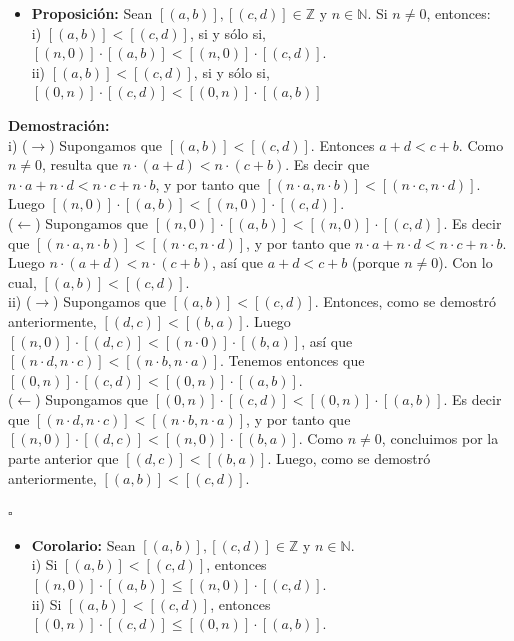\documentclass[10 pt]{article}
\begin{document}
\begin{itemize}
    \item \Large{\textbf{Proposición:} Sean $[(a,b)],[(c,d)] \in \mathbb Z$ y $n \in \mathbb N$. Si $n \neq 0$, entonces: \\

    i) $[(a,b)]<[(c,d)]$, si y sólo si, $[(n,0)] \cdot [(a,b)]<[(n,0)] \cdot [(c,d)]$. \\

    ii) $[(a,b)]<[(c,d)]$, si y sólo si, $[(0,n)] \cdot [(c,d)]<[(0,n)] \cdot [(a,b)]$ } \\
\end{itemize}

\Large{\textbf{Demostración:} \\

i) ($\rightarrow$) Supongamos que $[(a,b)]<[(c,d)]$. Entonces $a+d<c+b$. Como $n \neq 0$, resulta que $n \cdot (a+d)<n \cdot (c+b)$. Es decir que $n \cdot a+n \cdot d<n \cdot c+n \cdot b$, y por tanto que $[(n \cdot a,n \cdot b)]<[(n \cdot c,n \cdot d)]$. Luego $[(n,0)] \cdot [(a,b)]<[(n,0)] \cdot [(c,d)]$. \\

($\leftarrow$) Supongamos que $[(n,0)] \cdot [(a,b)]<[(n,0)] \cdot [(c,d)]$. Es decir que $[(n \cdot a,n \cdot b)]<[(n \cdot c,n \cdot d)]$, y por tanto que $n \cdot a+n \cdot d<n \cdot c+n \cdot b$. Luego $n \cdot (a+d)<n \cdot (c+b)$, así que $a+d<c+b$ (porque $n \neq 0$). Con lo cual, $[(a,b)]<[(c,d)]$. \\

ii) ($\rightarrow$) Supongamos que $[(a,b)]<[(c,d)]$. Entonces, como se demostró anteriormente, $[(d,c)]<[(b,a)]$. Luego $[(n,0)] \cdot [(d,c)]<[(n \cdot 0)] \cdot [(b,a)]$, así que $[(n \cdot d,n \cdot c)]<[(n \cdot b,n \cdot a)]$. Tenemos entonces que $[(0,n)] \cdot [(c,d)]<[(0,n)] \cdot [(a,b)]$. \\

($\leftarrow$) Supongamos que $[(0,n)] \cdot [(c,d)]<[(0,n)] \cdot [(a,b)]$. Es decir que $[(n \cdot d,n \cdot c)]<[(n \cdot b,n \cdot a)]$, y por tanto que $[(n,0)] \cdot [(d,c)]<[(n,0)] \cdot [(b,a)]$. Como $n \neq 0$, concluimos por la parte anterior que $[(d,c)]<[(b,a)]$. Luego, como se demostró anteriormente, $[(a,b)]<[(c,d)]$.} \\

\begin{flushright}
    $\square$
\end{flushright}

\begin{itemize}
    \item \Large{\textbf{Corolario:} Sean $[(a,b)],[(c,d)] \in \mathbb Z$ y $n \in \mathbb N$. \\

    i) Si $[(a,b)]<[(c,d)]$, entonces $[(n,0)] \cdot [(a,b)] \leq [(n,0)] \cdot [(c,d)]$. \\

    ii) Si $[(a,b)]<[(c,d)]$, entonces $[(0,n)] \cdot [(c,d)] \leq [(0,n)] \cdot [(a,b)]$.} \\
\end{itemize}
\end{document}
